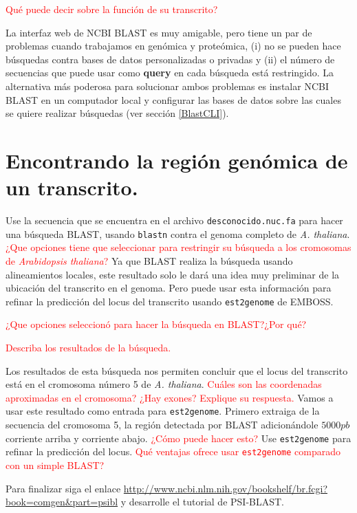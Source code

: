\documentclass[letter,11pt]{book}
\begin{document}
\textcolor{red}{{\textquestiondown}Qué puede decir sobre la función de su transcrito?}

La interfaz web de NCBI BLAST es muy amigable, pero tiene un par de problemas cuando trabajamos en genómica y proteómica, (i) no se pueden hace búsquedas contra bases de datos personalizadas o privadas y (ii) el número de secuencias que puede usar como \textbf{query} en cada búsqueda está restringido. La alternativa más poderosa para solucionar ambos problemas es instalar NCBI BLAST en un computador  local y configurar las bases de datos sobre las cuales se quiere realizar búsquedas (ver sección \ref{BlastCLI}).

\section{Encontrando la región genómica de un transcrito.}

Use la secuencia que se encuentra en el archivo \Verb+desconocido.nuc.fa+ para hacer una búsqueda BLAST, usando \Verb+blastn+ contra el genoma completo de \textit{A. thaliana}.  \textcolor{red}{¿Que opciones tiene que seleccionar para restringir su búsqueda a los cromosomas de \textit{Arabidopsis thaliana}?} Ya que BLAST realiza la búsqueda usando alineamientos locales, este resultado solo le dará una idea muy preliminar de la ubicación del transcrito en el genoma. Pero puede usar esta información para refinar la predicción del locus del transcrito usando \Verb+est2genome+ de EMBOSS. 

\textcolor{red}{¿Que opciones seleccionó para hacer la búsqueda en BLAST?¿Por qué?}

\textcolor{red}{Describa los resultados de la búsqueda.}

Los resultados de esta búsqueda nos permiten concluir que el locus del transcrito está en el cromosoma número 5 de \textit{A. thaliana}. \textcolor{red}{{\textquestiondown}Cuáles son las coordenadas aproximadas en el cromosoma? ¿Hay exones? Explique su respuesta.} Vamos a usar este resultado como entrada para \Verb+est2genome+. Primero extraiga de la secuencia del cromosoma 5, la región detectada por BLAST adicionándole $5000 pb$ corriente arriba y corriente abajo. \textcolor{red}{¿Cómo puede hacer esto?} Use \Verb+est2genome+ para refinar la predicción del locus. \textcolor{red}{{\textquestiondown}Qué ventajas ofrece usar \Verb+est2genome+ comparado con un simple BLAST?}

Para finalizar siga el enlace \url{http://www.ncbi.nlm.nih.gov/bookshelf/br.fcgi?book=comgen&part=psibl} y desarrolle el tutorial de PSI-BLAST.
\end{document}
